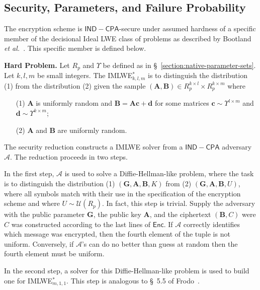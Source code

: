 \subsection{Security, Parameters, and Failure Probability}

The encryption scheme is $\mathsf{IND-CPA}$-secure under assumed hardness of a specific member of the decisional Ideal LWE class of problems as described by Bootland \emph{et al.}~\cite{BootlandCSV21}. This specific member is defined below.

\vspace{0.25cm}

\textbf{Hard Problem.} Let $R_p$ and $\Upsilon$ be defined as in \S~\ref{section:native-parameter-sets}. Let $k, l, m$ be small integers. The IMLWE$^*_{k,l,m}$ is to distinguish the distribution (1) from the distribution (2) given the sample $(\mathbf{A}, \mathbf{B}) \in R_p^{k \times l} \times R_p^{k \times m}$ where
\begin{itemize}
\item[(1)] $\mathbf{A}$ is uniformly random and $\mathbf{B} = \mathbf{A} \mathbf{c} + \mathbf{d}$ for some matrices $\mathbf{c} \sim \Upsilon^{l \times m}$ and $\mathbf{d} \sim \Upsilon^{k \times m}$;
\item[(2)] $\mathbf{A}$ and $\mathbf{B}$ are uniformly random.
\end{itemize}

\vspace{0.25cm}

The security reduction constructs a IMLWE solver from a $\mathsf{IND-CPA}$ adversary $\mathcal{A}$. The reduction proceeds in two steps.

In the first step, $\mathcal{A}$ is used to solve a Diffie-Hellman-like problem, where the task is to distinguish the distribution (1) $(\mathbf{G}, \mathbf{A}, \mathbf{B}, K)$ from (2) $(\mathbf{G}, \mathbf{A}, \mathbf{B}, U)$, where all symbols match with their use in the specification of the encryption scheme and where $U \sim \mathcal{U}(R_p)$. In fact, this step is trivial. Supply the adversary with the public parameter $\mathbf{G}$, the public key $\mathbf{A}$, and the ciphertext $(\mathbf{B}, C)$ were $C$ was constructed according to the last lines of $\mathsf{Enc}$. If $\mathcal{A}$ correctly identifies which message was encrypted, then the fourth element of the tuple is not uniform. Conversely, if $\mathcal{A}$'s can do no better than guess at random then the fourth element must be uniform.

In the second step, a solver for this Diffie-Hellman-like problem is used to build one for IMLWE$^*_{m, 1, 1}$. This step is analogous to \S~5.5 of Frodo~\cite{frodo}.

